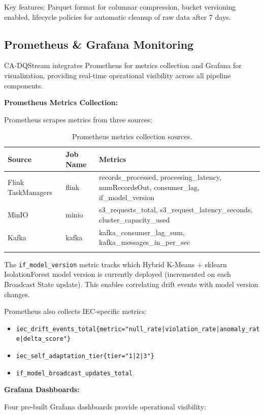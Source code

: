 Key features: Parquet format for columnar compression, bucket versioning enabled, lifecycle policies for automatic cleanup of raw data after 7 days.

\subsection{Prometheus \& Grafana Monitoring}

CA-DQStream integrates Prometheus for metrics collection and Grafana for visualization, providing real-time operational visibility across all pipeline components.

\textbf{Prometheus Metrics Collection:}

Prometheus scrapes metrics from three sources:

\begin{longtable}{|m{3.5cm}|m{3cm}|m{6.5cm}|}
\hline
\textbf{Source} & \textbf{Job Name} & \textbf{Metrics} \\ \hline
Flink TaskManagers & flink & records\_processed, processing\_latency, numRecordsOut, consumer\_lag, if\_model\_version \\ \hline
MinIO & minio & s3\_requests\_total, s3\_request\_latency\_seconds, cluster\_capacity\_used \\ \hline
Kafka & kafka & kafka\_consumer\_lag\_sum, kafka\_messages\_in\_per\_sec \\ \hline
\caption{Prometheus metrics collection sources.}
\label{tab:prometheus_metrics}
\end{longtable}

The \texttt{if\_model\_version} metric tracks which Hybrid K-Means + sklearn IsolationForest model version is currently deployed (incremented on each Broadcast State update). This enables correlating drift events with model version changes.

Prometheus also collects IEC-specific metrics:

\begin{itemize}
    \item \texttt{iec\_drift\_events\_total\{metric="null\_rate|violation\_rate|anomaly\_rate|delta\_score"\}}
    \item \texttt{iec\_self\_adaptation\_tier\{tier="1|2|3"\}}
    \item \texttt{if\_model\_broadcast\_updates\_total}
\end{itemize}

\textbf{Grafana Dashboards:}

Four pre-built Grafana dashboards provide operational visibility:

